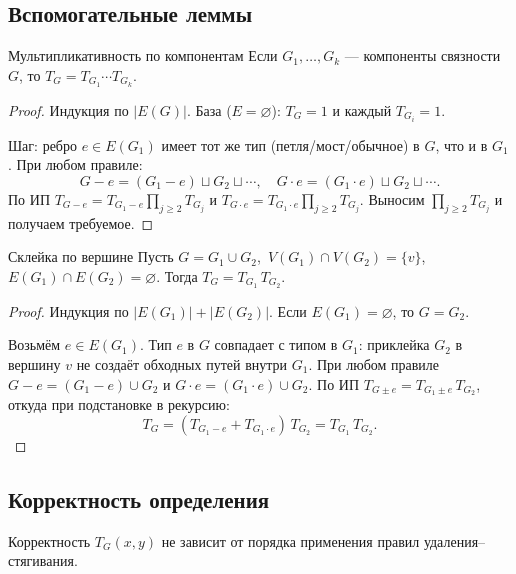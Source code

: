 \subsection{Вспомогательные леммы}

\begin{Lemma}{Мультипликативность по компонентам}{}
  Если $G_1,\dots,G_k$ --- компоненты связности $G$, то
  $T_G = T_{G_1} \cdots T_{G_k}$.
\end{Lemma}

\begin{proof}
  Индукция по $|E(G)|$. База ($E=\varnothing$): $T_G=1$ и каждый $T_{G_i}=1$.

  Шаг: ребро $e\in E(G_1)$ имеет тот же тип (петля/мост/обычное) в $G$,
  что и в $G_1$. При любом правиле:
  \[
    G - e = (G_1-e)\sqcup G_2\sqcup\cdots,\quad
    G \cdot e = (G_1\cdot e)\sqcup G_2\sqcup\cdots.
  \]
  По ИП $T_{G-e} = T_{G_1-e}\prod_{j\ge 2}T_{G_j}$
  и $T_{G\cdot e} = T_{G_1\cdot e}\prod_{j\ge 2}T_{G_j}$.
  Выносим $\prod_{j\ge 2}T_{G_j}$ и получаем требуемое.
\end{proof}

\begin{Lemma}{Склейка по вершине}{}
  Пусть $G = G_1 \cup G_2$,\ $V(G_1)\cap V(G_2)=\{v\}$,
  $E(G_1)\cap E(G_2)=\varnothing$. Тогда $T_G = T_{G_1}\,T_{G_2}$.
\end{Lemma}

\begin{proof}
  Индукция по $|E(G_1)|+|E(G_2)|$. Если $E(G_1)=\varnothing$, то $G=G_2$.

  Возьмём $e\in E(G_1)$. Тип $e$ в $G$ совпадает с типом в $G_1$:
  приклейка $G_2$ в вершину $v$ не создаёт обходных путей внутри $G_1$.
  При любом правиле $G-e=(G_1-e)\cup G_2$ и $G\cdot e=(G_1\cdot e)\cup G_2$.
  По ИП $T_{G\pm e}=T_{G_1\pm e}\,T_{G_2}$, откуда при подстановке в рекурсию:
  \[
    T_G = (T_{G_1-e}+T_{G_1\cdot e})\,T_{G_2} = T_{G_1}\,T_{G_2}.
  \]
\end{proof}

\subsection{Корректность определения}

\begin{Proposition}{Корректность}{}
  $T_G(x,y)$ не зависит от порядка применения правил удаления--стягивания.
\end{Proposition}


